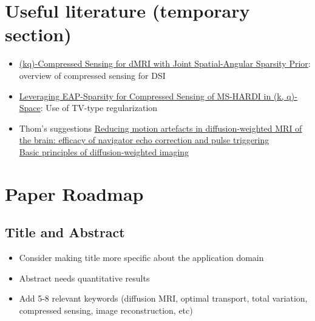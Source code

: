 \documentclass[journal,twoside,web]{ieeecolor}
\begin{document}
\section*{Useful literature (temporary section)}
\begin{itemize}
    \item \href{chrome-extension://efaidnbmnnnibpcajpcglclefindmkaj/https://arxiv.org/pdf/1707.09958}{(kq)-Compressed Sensing for dMRI with Joint Spatial-Angular Sparsity Prior}: overview of compressed sensing for DSI
    \item \href{https://drive.google.com/file/d/19IQJwwOZqE2nf86KQN4G5pCdBtBXqUcw/view?usp=sharing}{Leveraging EAP-Sparsity for Compressed Sensing of MS-HARDI in (k, q)-Space}: Use of TV-type regularization
    \item Thom's suggestions
    \href{https://link.springer.com/article/10.1007/s002340050020}{Reducing motion artefacts in diffusion-weighted MRI of the brain: efficacy of navigator echo correction and pulse triggering}\\
    \href{https://www.ejradiology.com/article/S0720-048X(02)00303-0/fulltext}{Basic principles of diffusion-weighted imaging
}
\end{itemize}

\section{Paper Roadmap}

\subsection{Title and Abstract}
\begin{itemize}
    \item Consider making title more specific about the application domain
    \item Abstract needs quantitative results
    \item Add 5-8 relevant keywords (diffusion MRI, optimal transport, total variation, compressed sensing, image reconstruction, etc)
\end{itemize}
\end{document}
